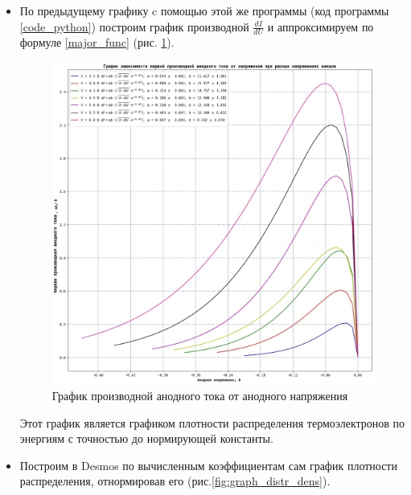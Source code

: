 \begin{itemize}
    \item По предыдущему графику c помощью этой же программы (код программы \ref{code_python})
    построим график производной $\frac{dI}{dU}$ и аппроксимируем по формуле \ref{major_func} (рис. \ref{fig:graph_proizv}).
    \begin{figure}[h!p]
    \centering
    \includegraphics[scale=0.8]{dI_dU.jpg}
    \caption{График производной анодного тока от анодного напряжения}
    \label{fig:graph_proizv}
    \end{figure}

     Этот график является графиком плотности распределения термоэлектронов по энергиям с точностью до нормирующей константы.

     \newpage

    \item Построим в Desmos по вычисленным коэффициентам сам график плотности распределения, отнормировав его (рис.\ref{fig:graph_distr_dens}).



\end{itemize}

